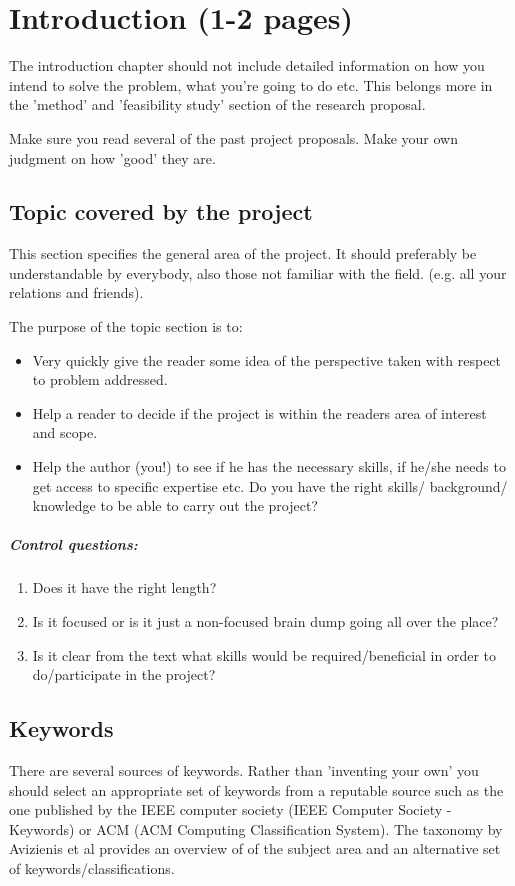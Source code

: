 \chapter{Introduction (1-2 pages)}
The introduction chapter should not include detailed information on
how you intend to solve the problem, what you're going to do etc.
This belongs more in the 'method' and 'feasibility study' section
of the research proposal.

Make sure you read several of the past project proposals.
Make your own judgment on how 'good' they are.

\section{Topic covered by the project}
This section specifies the general area of the project.
It should preferably be understandable by everybody,
also those not familiar with the field. (e.g. all your relations and friends).

The purpose of the topic section is to:
\begin{itemize}
\item Very quickly give the reader some idea of the perspective taken
with respect to problem addressed.  
\item Help a reader to decide if the project
is within the readers area of interest and scope.
\item Help the author (you!) to see if he has the necessary skills,
if he/she needs to get access to specific expertise etc.
Do you have the right skills/ background/ knowledge
to be able to carry out the project?
\end{itemize}

\paragraph{Control questions:}
\begin{enumerate}
\item Does it have the right length?
\item Is it focused or is it just a non-focused brain dump going all over the place?
\item Is it clear from the text what skills would be required/beneficial in order to do/participate in the project?
\end{enumerate}


\section{Keywords}
There are several sources of keywords. Rather than 'inventing your own' you should select an appropriate set of keywords from a reputable source such as the one published by the IEEE computer society (IEEE Computer Society - Keywords) or ACM (ACM Computing Classification System).
The taxonomy by Avizienis et al\cite{avizienis2004} provides an overview of of the subject area and an alternative set of keywords/classifications.


